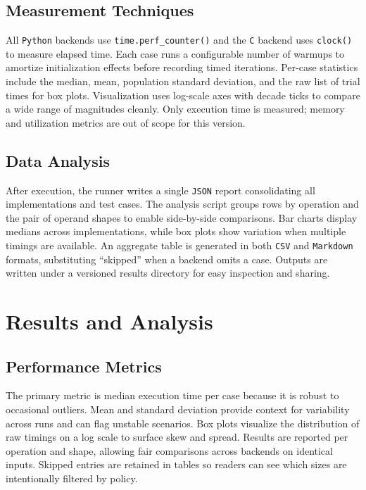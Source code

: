 \documentclass[a4paper,12pt]{article}
\begin{document}
\subsection{Measurement Techniques}
All \texttt{Python} backends use \texttt{time.perf\_counter()} and the \texttt{C} backend uses \texttt{clock()} to measure elapsed time. Each case runs a configurable number of warmups to amortize initialization effects before recording timed iterations. Per-case statistics include the median, mean, population standard deviation, and the raw list of trial times for box plots. Visualization uses log-scale axes with decade ticks to compare a wide range of magnitudes cleanly. Only execution time is measured; memory and utilization metrics are out of scope for this version.

\subsection{Data Analysis}
After execution, the runner writes a single \texttt{JSON} report consolidating all implementations and test cases. The analysis script groups rows by operation and the pair of operand shapes to enable side-by-side comparisons. Bar charts display medians across implementations, while box plots show variation when multiple timings are available. An aggregate table is generated in both \texttt{CSV} and \texttt{Markdown} formats, substituting “skipped” when a backend omits a case. Outputs are written under a versioned results directory for easy inspection and sharing.

\section{Results and Analysis}
\subsection{Performance Metrics}
The primary metric is median execution time per case because it is robust to occasional outliers. Mean and standard deviation provide context for variability across runs and can flag unstable scenarios. Box plots visualize the distribution of raw timings on a log scale to surface skew and spread. Results are reported per operation and shape, allowing fair comparisons across backends on identical inputs. Skipped entries are retained in tables so readers can see which sizes are intentionally filtered by policy.
\end{document}
